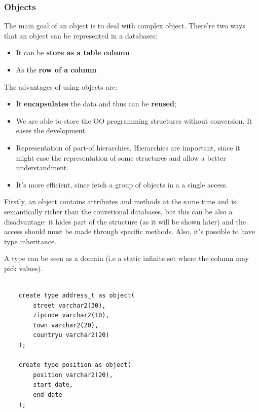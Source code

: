 \newpage  
\subsubsection{Objects}

The main goal of an object is to deal with complex object. There're two ways that an object can be represented in a databases:

\begin{itemize}
    \item It can be \textbf{store as a table column}
    \item As the \textbf{row of a column}
\end{itemize}

The advantages of using objects are:
\begin{itemize}
    \item It \textbf{encapsulates} the data and thus can be \textbf{reused};
    \item We are able to store the OO programming structures without conversion. It eases the development. 
    \item Representation of part-of hierarchies. Hierarchies are important, since it might ease the representation of some structures and allow a better understandment. 
    \item It's more efficient, since fetch a group of objects in a a single access.
\end{itemize}


Firstly, an object contains attributes and methods at the same time and is semantically richer than the convetional databases, but this can be also a disadvantage: it hides part of the structure (as it will be shown later) and the access should must be made through specific methods. Also, it's possible to have type inheritance. 


A type can be seen as a domain (i.e a static infinite set where the column may pick values). 

\begin{lstlisting}

    create type address_t as object(
        street varchar2(30),
        zipcode varchar2(10),
        town varchar2(20),
        countryu varchar2(20)
    );

    create type position as object(
        position varchar2(20),
        start date,
        end date
    );
\end{lstlisting} 

